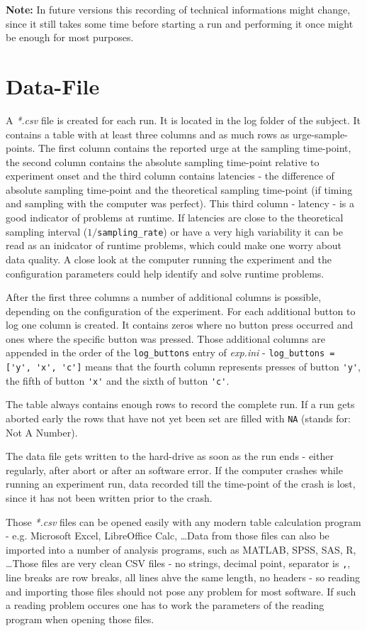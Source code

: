 \documentclass[12pt,a4paper]{book}
\begin{document}
\textbf{Note:} In future versions this recording of technical informations might change, since it still takes some time before starting a run and performing it once might be enough for most purposes.

\section{Data-File}

A \textit{*.csv} file is created for each run. It is located in the log folder of the subject. It contains a table with at least three columns and as much rows as urge-sample-points. The first column contains the reported urge at the sampling time-point, the second column contains the absolute sampling time-point relative to experiment onset and the third column contains latencies - the difference of absolute sampling time-point and the theoretical sampling time-point (if timing and sampling with the computer was perfect). This third column - latency - is a good indicator of problems at runtime. If latencies are close to the theoretical sampling interval ($1 / $\verb|sampling_rate|) or have a very high variability it can be read as an inidcator of runtime problems, which could make one worry about data quality. A close look at the computer running the experiment and the configuration parameters could help identify and solve runtime problems. 

After the first three columns a number of additional columns is possible, depending on the configuration of the experiment. For each additional button to log one column is created. It contains zeros where no button press occurred and ones where the specific button was pressed. Those additional columns are appended in the order of the \verb|log_buttons| entry of \textit{exp.ini} - \verb|log_buttons = ['y', 'x', 'c']| means that the fourth column represents presses of button \verb|'y'|, the fifth of button \verb|'x'| and the sixth of button \verb|'c'|.

The table always contains enough rows to record the complete run. If a run gets aborted early the rows that have not yet been set are filled with \verb|NA| (stands for: Not A Number).

The data file gets written to the hard-drive as soon as the run ends - either regularly, after abort or after an software error. If the computer crashes while running an experiment run, data recorded till the time-point of the crash is lost, since it has not been written prior to the crash.

Those \textit{*.csv} files can be opened easily with any modern table calculation program - e.g. Microsoft Excel, LibreOffice Calc, \dots Data from those files can also be imported into a number of analysis programs, such as MATLAB, SPSS, SAS, R, \dots Those files are very clean CSV files - no strings, decimal point, separator is \verb|,|, line breaks are row breaks, all lines ahve the same length, no headers - so reading and importing those files should not pose any problem for most software. If such a reading problem occures one has to work the parameters of the reading program when opening those files.
\end{document}
